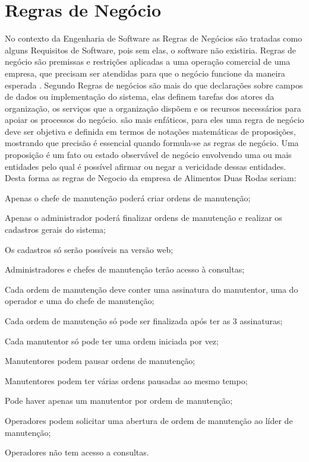 \section{Regras de Negócio}
No contexto da Engenharia de Software as Regras de Negócios são tratadas como alguns Requisitos de Software, pois sem elas, o software não existiria. Regras de negócio são premissas e restrições aplicadas a uma operação comercial de uma empresa, que precisam ser atendidas para que o negócio funcione da maneira esperada \cite{crerie2008identificacao}.
Segundo \cite{2001SilviaInes} Regras de negócios são mais do que declarações sobre campos de dados ou implementação do sistema, elas definem tarefas dos atores da organização, os serviços que a organização dispõem e os recursos necessários para apoiar os processos do negócio.
\cite{1997kilovSimmonds} são mais enfáticos, para eles uma regra de negócio deve ser objetiva e definida em termos de notações matemáticas de proposições, mostrando que precisão é essencial quando formula-se as regras de negócio. Uma proposição é um fato ou estado observável de negócio envolvendo uma ou mais entidades pelo qual é possível afirmar ou negar a vericidade dessas entidades.
Desta forma as regras de Negocio da empresa de Alimentos Duas Rodas seriam:

\begin{subalineas}
	\item {Apenas o chefe de manutenção poderá criar ordens de manutenção};
	\item {Apenas o administrador poderá finalizar ordens de manutenção e realizar os cadastros gerais do sistema};
	\item {Os cadastros só serão possíveis na versão web};
	\item {Administradores e chefes de manutenção terão acesso à consultas};
	\item {Cada ordem de manutenção deve conter uma assinatura do manutentor, uma do operador e uma do chefe de manutenção};
	\item {Cada ordem de manutenção só pode ser finalizada após ter as 3 assinaturas};
	\item {Cada manutentor só pode ter uma ordem iniciada por vez};
	\item {Manutentores podem pausar ordens de manutenção};
	\item {Manutentores podem ter várias ordens pausadas ao mesmo tempo};
	\item {Pode haver apenas um manutentor por ordem de manutenção};
	\item {Operadores podem solicitar uma abertura de ordem de manutenção ao líder de manutenção};
	\item {Operadores não  tem acesso a consultas}.
\end{subalineas}

